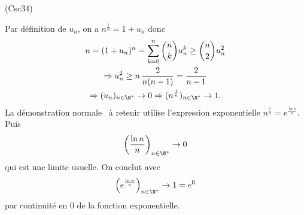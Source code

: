 \begin{tiny}(Csc34)\end{tiny} Par définition de $u_n$, on a $n^{\frac{1}{n}} = 1 + u_n$ donc 
\begin{multline*}
n = (1+u_n)^n 
  = \sum_{k=0}^n \binom{n}{k} u_n^k 
  \geq \binom{n}{2} u_n^2 \\
  \Rightarrow u_n^2 \geq n\, \frac{2}{n(n-1)}= \frac{2}{n-1}\\ 
  \Rightarrow (u_n)_{n\in \N^*} \rightarrow 0 
  \Rightarrow (n^{\frac{1}{n}})_{n\in \N^*} \rightarrow 1.
\end{multline*}
La démonstration  \og normale\fg~ à retenir utilise l'expression exponentielle $n^{\frac{1}{n}} = e ^{\frac{\ln n}{n}}$. Puis
\[
  \left( \frac{\ln n}{n}\right)_{n\in \N^*} \rightarrow 0
\]
qui est une limite usuelle. On conclut avec
\[
  \left( e^{\frac{\ln n}{n}}\right)_{n\in \N^*} \rightarrow 1 = e^0  
\]
par continuité en $0$ de la fonction exponentielle.

